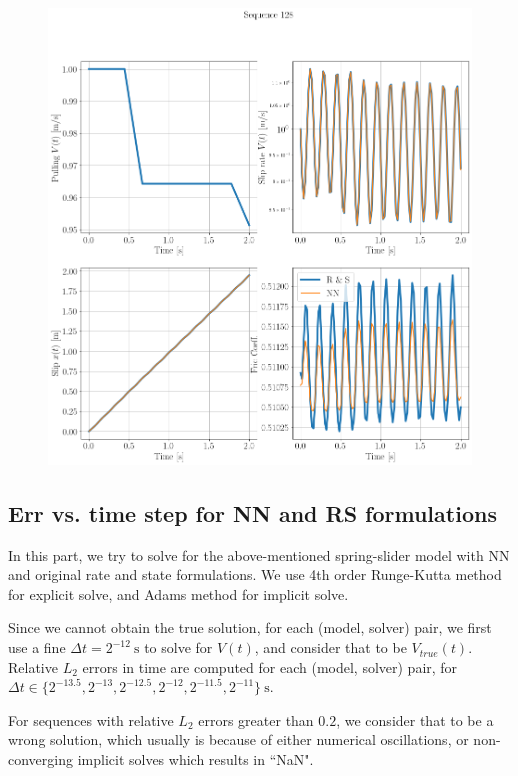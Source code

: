 \begin{figure}[H]
    \centering
    \includegraphics[width=1.0\textwidth]{images/SpringSlider128.png}
\end{figure}

\newpage
\subsection{Err vs. time step for NN and RS formulations}
In this part, 
we try to solve for the above-mentioned spring-slider model with NN and original rate and state formulations. 
We use 4th order Runge-Kutta method for explicit solve, 
and Adams method for implicit solve. 

Since we cannot obtain the true solution, 
for each (model, solver) pair, 
we first use a fine $\Delta t = 2^{-12}\ \mathrm{s}$ to solve for $V(t)$, 
and consider that to be $V_{true}(t)$. 
Relative $L_2$ errors in time are computed for each (model, solver) pair, 
for $\Delta t \in \{2^{-13.5}, 2^{-13}, 2^{-12.5}, 2^{-12}, 2^{-11.5}, 2^{-11}\}\ \mathrm{s}$. 

For sequences with relative $L_2$ errors greater than $0.2$, 
we consider that to be a wrong solution, 
which usually is because of either numerical oscillations, 
or non-converging implicit solves which results in ``NaN". 

